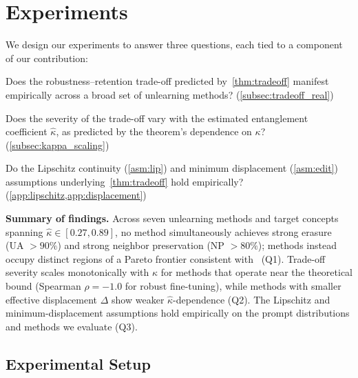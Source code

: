 \section{Experiments}
\label{sec:experiment}
We design our experiments to answer three questions, each tied to a component of our contribution:


\begin{squishenumerate}
    \item[\textbf{Q1.}] Does the robustness--retention trade-off predicted by~\cref{thm:tradeoff} manifest empirically across a broad set of unlearning methods? (\cref{subsec:tradeoff_real})
    \item[\textbf{Q2.}] Does the severity of the trade-off vary with the estimated entanglement coefficient $\hat\kappa$, as predicted by the theorem's dependence on $\kappa$? (\cref{subsec:kappa_scaling})
    \item[\textbf{Q3.}] Do the Lipschitz continuity (\cref{asm:lip}) and minimum displacement (\cref{asm:edit}) assumptions underlying~\cref{thm:tradeoff} hold empirically? (\cref{app:lipschitz,app:displacement})
\end{squishenumerate}
\noindent \textbf{Summary of findings.} Across seven unlearning methods and target concepts spanning $\hat\kappa \in [0.27, 0.89]$, no method simultaneously achieves strong erasure (UA $> 90\%$) and strong neighbor preservation (NP $> 80\%$); methods instead occupy distinct regions of a Pareto frontier consistent with~ (Q1). Trade-off severity scales monotonically with $\hat\kappa$ for methods that operate near the theoretical bound (Spearman $\rho = -1.0$ for robust fine-tuning), while methods with smaller effective displacement $\Delta$ show weaker $\hat\kappa$-dependence (Q2). The Lipschitz and minimum-displacement assumptions hold empirically on the prompt distributions and methods we evaluate (Q3).


\subsection{Experimental Setup}
\label{subsec:setup}

